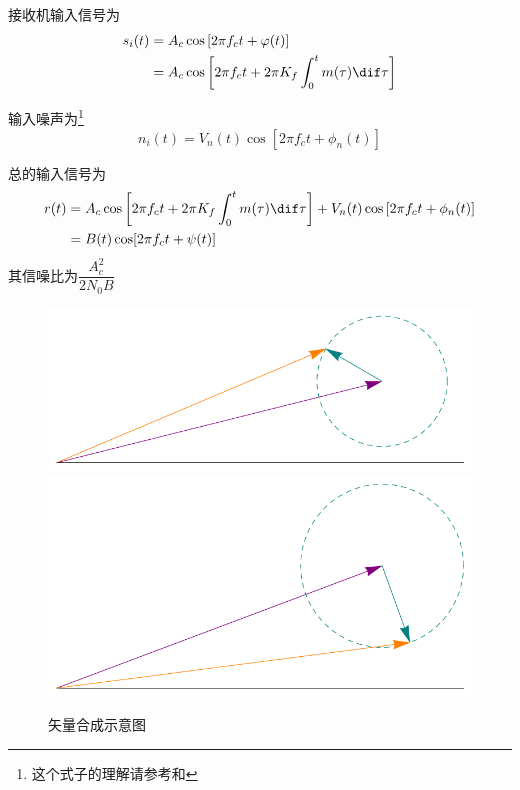     接收机输入信号为
    \begin{equation}
        \begin{split}
            s_i(t)&=A_c\cos\left[2\pi f_ct+\varphi(t)\right]\\
                  &=A_c\cos\left[2\pi f_ct+2\pi K_f\int_{0}^{t}m(\tau)\dif \tau\right]
        \end{split}
    \end{equation}

    输入噪声为\footnote{这个式子的理解请参考和}
    \begin{equation}
        n_i(t)=V_n(t)\cos\left[2\pi f_ct+\phi_n(t)\right]
    \end{equation}

    总的输入信号为
    \begin{equation}
        \begin{split}
            r(t)&=A_c\cos\left[2\pi f_ct+2\pi K_f\int_{0}^{t}m(\tau)\dif \tau\right]+V_n(t)\cos\left[2\pi f_ct+\phi_n(t)\right]\\
                &=B(t)\cos[2\pi f_ct+\psi(t)]
        \end{split}
    \end{equation}
    其信噪比为$\dfrac{A_c^2}{2N_0B}$

    \begin{figure}[H]
        \centering
        \includegraphics[scale=0.5]{body/image/FMnoise1.pdf}
        \hspace{30pt}
        \includegraphics[scale=0.5]{body/image/FMnoise2.pdf}
        \caption{矢量合成示意图}
    \end{figure}

